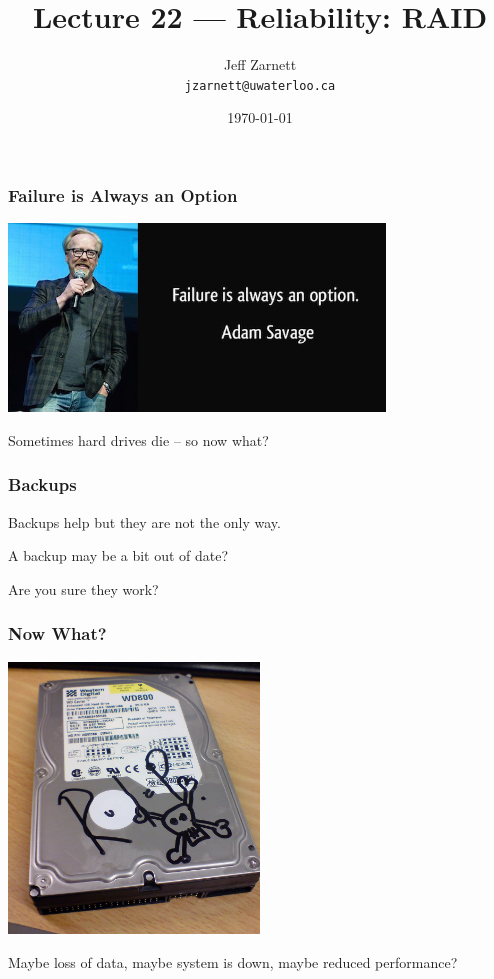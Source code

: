 

\title{Lecture 22 --- Reliability: RAID }

\author{Jeff Zarnett \\ \small \texttt{jzarnett@uwaterloo.ca}}
\date{\today}




\begin{frame}
  \titlepage

 \end{frame}


\begin{frame}
\frametitle{Failure is Always an Option}

\begin{center}
	\includegraphics[width=0.75\textwidth]{images/failure.jpg}
\end{center}

Sometimes hard drives die -- so now what?

\end{frame}


\begin{frame}
\frametitle{Backups}

Backups help but they are not the only way.

A backup may be a bit out of date?

Are you sure they work?

\end{frame}


\begin{frame}
\frametitle{Now What?}

\begin{center}
	\includegraphics[width=0.5\textwidth]{images/rip-hdd.jpg}
\end{center}

Maybe loss of data, maybe system is down, maybe reduced performance?

\end{frame}


